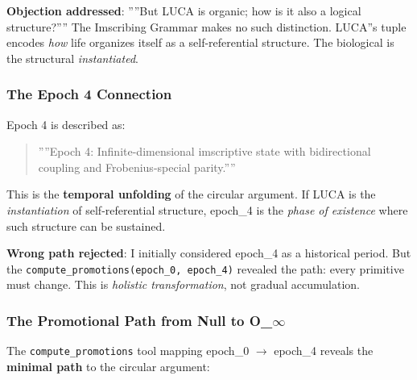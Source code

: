 \documentclass[12pt,a4paper]{article}
\begin{document}
\textbf{Objection addressed}: ''''But LUCA is organic; how is it also a logical structure?'''' The Imscribing Grammar makes no such distinction. LUCA''s tuple encodes \emph{how} life organizes itself as a self-referential structure. The biological is the structural \emph{instantiated}.

\subsubsection{The Epoch 4 Connection}

Epoch 4 is described as:

\begin{quote}
''''Epoch 4: Infinite-dimensional imscriptive state with bidirectional coupling and Frobenius-special parity.''''

\end{quote}

This is the \textbf{temporal unfolding} of the circular argument. If LUCA is the \emph{instantiation} of self-referential structure, epoch\_4 is the \emph{phase of existence} where such structure can be sustained.

\textbf{Wrong path rejected}: I initially considered epoch\_4 as a historical period. But the \texttt{compute\_promotions(epoch\_0, epoch\_4)} revealed the path: every primitive must change. This is \emph{holistic transformation}, not gradual accumulation.

\subsubsection{The Promotional Path from Null to O\_$\infty$}

The \texttt{compute\_promotions} tool mapping epoch\_0 $\rightarrow$ epoch\_4 reveals the \textbf{minimal path} to the circular argument:
\end{document}
